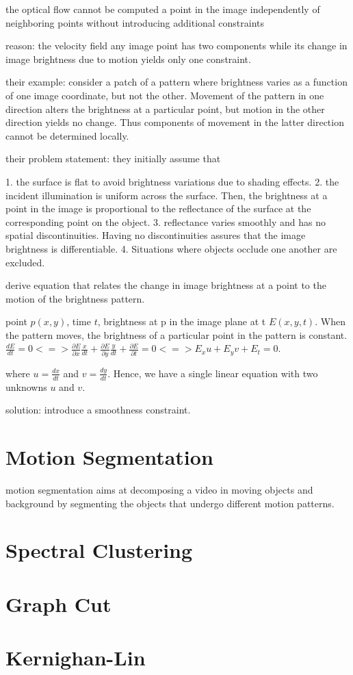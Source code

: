 the optical flow cannot be computed a point in the image independently of neighboring points without introducing additional constraints

reason: the velocity field any image point has two components while its change in image brightness due to motion yields only one constraint.

their example: consider a patch of a pattern where brightness varies as a function of one image coordinate, but not the other. Movement of the pattern in one direction alters the brightness at a particular point, but motion in the other direction yields no change. Thus components of movement in the latter direction cannot be determined locally.

their problem statement:
they initially assume that 

1. the surface is flat to avoid brightness variations due to shading effects.
2. the incident illumination is uniform across the surface. Then, the brightness at a point in the image is proportional to the reflectance of the surface at the corresponding point on the object.
3. reflectance varies smoothly and has no spatial discontinuities. Having no discontinuities assures that the image brightness is differentiable.
4. Situations where objects occlude one another are excluded.

derive equation that relates the change in image brightness at a point to the motion of the brightness pattern.

point $p(x,y)$, time $t$, brightness at p in the image plane at t $E(x,y,t)$.
When the pattern moves, the brightness of a particular point in the pattern is constant. 
$\frac{d E}{dt} = 0 <=> \frac{\partial E}{\partial x} \frac{x}{dt} + \frac{\partial E}{\partial y} \frac{y}{dt} + \frac{\partial E}{\partial t} = 0 <=> E_{x} u + E_{y} v + E_{t} = 0$.

where $u = \frac{dx}{dt}$ and $v = \frac{dy}{dt}$. Hence, we have a single linear equation with two unknowns $u$ and $v$.

solution: introduce a smoothness constraint.


\section{Motion Segmentation}
motion segmentation aims at decomposing a video in moving objects and background by segmenting the objects that undergo different motion patterns.
\section{Spectral Clustering}
\section{Graph Cut}
\section{Kernighan-Lin}

